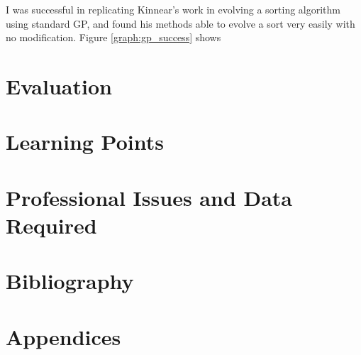 \documentclass{article}
\begin{document}
        I was successful in replicating Kinnear's work in evolving a sorting algorithm using standard GP, and found his methods able to evolve a sort very easily with no modification. Figure \ref{graph:gp_success} shows 
    \section{Evaluation}

    \section{Learning Points}

    \section{Professional Issues and Data Required}

    \section{Bibliography}

    
    

    \section{Appendices}
\end{document}
